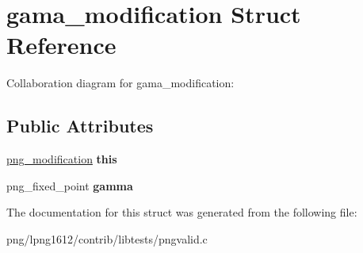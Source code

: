 \hypertarget{structgama__modification}{\section{gama\+\_\+modification Struct Reference}
\label{structgama__modification}
}


Collaboration diagram for gama\+\_\+modification\+:
\subsection*{Public Attributes}
\begin{DoxyCompactItemize}
\item 
\hypertarget{structgama__modification_a45af344527665eb4caca44b365a2d6f5}{\hyperlink{structpng__modification}{png\+\_\+modification} {\bfseries this}}\label{structgama__modification_a45af344527665eb4caca44b365a2d6f5}

\item 
\hypertarget{structgama__modification_aa438b786a6648d768971f1a401175a15}{png\+\_\+fixed\+\_\+point {\bfseries gamma}}\label{structgama__modification_aa438b786a6648d768971f1a401175a15}

\end{DoxyCompactItemize}


The documentation for this struct was generated from the following file\+:\begin{DoxyCompactItemize}
\item 
png/lpng1612/contrib/libtests/pngvalid.\+c\end{DoxyCompactItemize}
